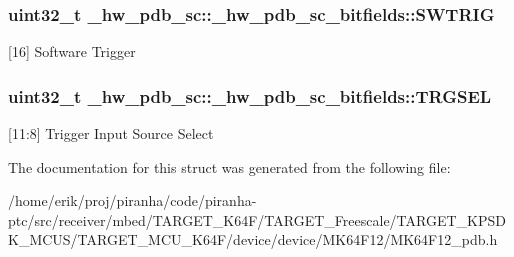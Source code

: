 \subsubsection[{\texorpdfstring{S\+W\+T\+R\+IG}{SWTRIG}}]{\setlength{\rightskip}{0pt plus 5cm}uint32\+\_\+t \+\_\+hw\+\_\+pdb\+\_\+sc\+::\+\_\+hw\+\_\+pdb\+\_\+sc\+\_\+bitfields\+::\+S\+W\+T\+R\+IG}\hypertarget{struct__hw__pdb__sc_1_1__hw__pdb__sc__bitfields_a944787b0230f8b0c4ba78cb66d7bbc58}{}\label{struct__hw__pdb__sc_1_1__hw__pdb__sc__bitfields_a944787b0230f8b0c4ba78cb66d7bbc58}
\mbox{[}16\mbox{]} Software Trigger 
\subsubsection[{\texorpdfstring{T\+R\+G\+S\+EL}{TRGSEL}}]{\setlength{\rightskip}{0pt plus 5cm}uint32\+\_\+t \+\_\+hw\+\_\+pdb\+\_\+sc\+::\+\_\+hw\+\_\+pdb\+\_\+sc\+\_\+bitfields\+::\+T\+R\+G\+S\+EL}\hypertarget{struct__hw__pdb__sc_1_1__hw__pdb__sc__bitfields_acf729a36d7964081a55b73e95d71c062}{}\label{struct__hw__pdb__sc_1_1__hw__pdb__sc__bitfields_acf729a36d7964081a55b73e95d71c062}
\mbox{[}11\+:8\mbox{]} Trigger Input Source Select 

The documentation for this struct was generated from the following file\+:\begin{DoxyCompactItemize}
\item 
/home/erik/proj/piranha/code/piranha-\/ptc/src/receiver/mbed/\+T\+A\+R\+G\+E\+T\+\_\+\+K64\+F/\+T\+A\+R\+G\+E\+T\+\_\+\+Freescale/\+T\+A\+R\+G\+E\+T\+\_\+\+K\+P\+S\+D\+K\+\_\+\+M\+C\+U\+S/\+T\+A\+R\+G\+E\+T\+\_\+\+M\+C\+U\+\_\+\+K64\+F/device/device/\+M\+K64\+F12/M\+K64\+F12\+\_\+pdb.\+h\end{DoxyCompactItemize}

